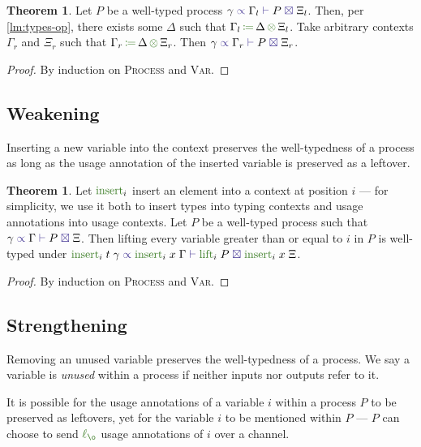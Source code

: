 \documentclass[a4paper,UKenglish,cleveref,autoref,thm-restate,authorcolumns]{lipics-v2019}
\theoremstyle{definition}
\newtheorem{nitheorem}[theorem]{Theorem}
\newcommand{\type}[1]{\textcolor{BlueViolet}{\operatorname{#1}}}
\newcommand{\func}[1]{\textcolor{OliveGreen}{\operatorname{#1}}}
\newcommand{\opctx}[3]{#1 \, \func{\coloneqq} \, #2 \, \func{\otimes} \, #3}
\newcommand{\lz}{\func{\ell_{\o}}}
\newcommand{\types}[4]{#1 \; \type{\propto} \; #2 \; \type{\vdash} \; #3 \; \type{\boxtimes} \; #4}
\begin{document}
\begin{nitheorem}
  \label{thm:framing}
  Let $P$ be a well-typed process $\types{\gamma}{\Gamma_l}{P}{\Xi_l}$.
  Then, per \autoref{lm:types-op}, there exists some $\Delta$ such that $\opctx{\Gamma_l}{\Delta}{\Xi_l}$.
  Take arbitrary contexts $\Gamma_r$ and $\Xi_r$ such that $\opctx{\Gamma_r}{\Delta}{\Xi_r}$.
  Then $\types{\gamma}{\Gamma_r}{P}{\Xi_r}$.
\end{nitheorem}
\begin{proof}
  By induction on \textsc{Process} and \textsc{Var}.
\end{proof}

\subsection{Weakening}
\label{weakening}

Inserting a new variable into the context preserves the well-typedness of a process as long as the usage annotation of the inserted variable is preserved as a leftover.

\begin{nitheorem}
  \label{thm:weakening}
  Let $\func{insert}_i$ insert an element into a context at position $i$ --- for simplicity, we use it both to insert types into typing contexts and usage annotations into usage contexts.
  Let $P$ be a well-typed process such that $\types{\gamma}{\Gamma}{P}{\Xi}$.
  Then lifting every variable greater than or equal to $i$ in $P$ is well-typed under $\types{\func{insert}_i \; t \; \gamma}{\func{insert}_i \; x \; \Gamma}{\func{lift}_i \; P}{\func{insert}_i \; x \; \Xi}$.
\end{nitheorem}
\begin{proof}
  By induction on \textsc{Process} and \textsc{Var}.
\end{proof}

\subsection{Strengthening}
\label{strengthening}

Removing an unused variable preserves the well-typedness of a process.
We say a variable is \emph{unused} within a process if neither inputs nor outputs refer to it.

\begin{remark}
  It is possible for the usage annotations of a variable $i$ within a process $P$ to be preserved as leftovers, yet for the variable $i$ to be mentioned within $P$ --- $P$ can choose to send $\lz$ usage annotations of $i$ over a channel.
\end{remark}
\end{document}
